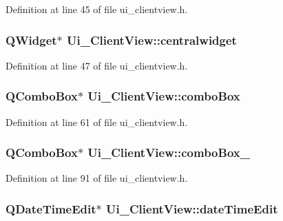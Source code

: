Definition at line 45 of file ui\+\_\+clientview.\+h.

\hypertarget{class_ui___client_view_abab1ce2b659b594baba531fcdae6bc87}{}
\subsubsection[{centralwidget}]{\setlength{\rightskip}{0pt plus 5cm}Q\+Widget$\ast$ Ui\+\_\+\+Client\+View\+::centralwidget}\label{class_ui___client_view_abab1ce2b659b594baba531fcdae6bc87}


Definition at line 47 of file ui\+\_\+clientview.\+h.

\hypertarget{class_ui___client_view_a4272861ad4c5565d62485516b5fc046f}{}
\subsubsection[{combo\+Box}]{\setlength{\rightskip}{0pt plus 5cm}Q\+Combo\+Box$\ast$ Ui\+\_\+\+Client\+View\+::combo\+Box}\label{class_ui___client_view_a4272861ad4c5565d62485516b5fc046f}


Definition at line 61 of file ui\+\_\+clientview.\+h.

\hypertarget{class_ui___client_view_a08415ac99e112d1847e4297c5d6ff318}{}
\subsubsection[{combo\+Box\+\_\+2}]{\setlength{\rightskip}{0pt plus 5cm}Q\+Combo\+Box$\ast$ Ui\+\_\+\+Client\+View\+::combo\+Box\+\_}\label{class_ui___client_view_a08415ac99e112d1847e4297c5d6ff318}


Definition at line 91 of file ui\+\_\+clientview.\+h.

\hypertarget{class_ui___client_view_a3ca4d48937a0662ed8ec86ce0e31394f}{}
\subsubsection[{date\+Time\+Edit}]{\setlength{\rightskip}{0pt plus 5cm}Q\+Date\+Time\+Edit$\ast$ Ui\+\_\+\+Client\+View\+::date\+Time\+Edit}\label{class_ui___client_view_a3ca4d48937a0662ed8ec86ce0e31394f}


